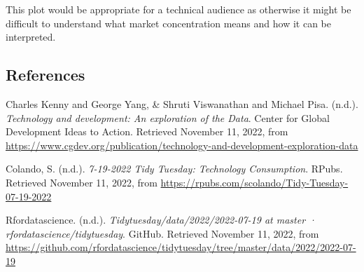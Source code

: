 \documentclass[
]{article}
\begin{document}
This plot would be appropriate for a technical audience as otherwise it
might be difficult to understand what market concentration means and how
it can be interpreted.

\hypertarget{references}{%
\subsection{References}\label{references}}

Charles Kenny and George Yang, \& Shruti Viswanathan and Michael Pisa.
(n.d.). \emph{Technology and development: An exploration of the Data}.
Center for Global Development \textbar{} Ideas to Action. Retrieved
November 11, 2022, from
\url{https://www.cgdev.org/publication/technology-and-development-exploration-data}

Colando, S. (n.d.). \emph{7-19-2022 Tidy Tuesday: Technology
Consumption}. RPubs. Retrieved November 11, 2022, from
\url{https://rpubs.com/scolando/Tidy-Tuesday-07-19-2022}

Rfordatascience. (n.d.). \emph{Tidytuesday/data/2022/2022-07-19 at
master · rfordatascience/tidytuesday}. GitHub. Retrieved November 11,
2022, from
\url{https://github.com/rfordatascience/tidytuesday/tree/master/data/2022/2022-07-19}
\end{document}
